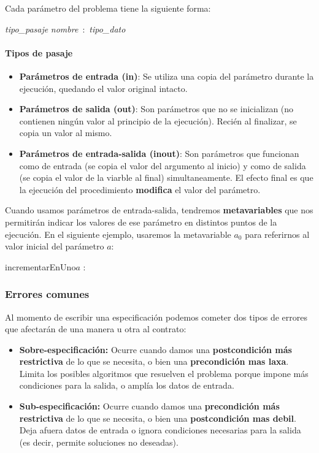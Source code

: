 Cada parámetro del problema tiene la siguiente forma:
\begin{center}
	\textit{tipo\_pasaje} \textit{nombre}~:~\textit{tipo\_dato}
\end{center}

\paragraph{Tipos de pasaje} 
\begin{itemize}
	\item \textbf{Parámetros de entrada (in)}: Se utiliza una copia del parámetro durante la ejecución, quedando el valor original intacto.
	\item \textbf{Parámetros de salida (out)}: Son parámetros que no se inicializan (no contienen ningún valor al principio de la ejecución). Recién al finalizar, se copia un valor al mismo.
	\item \textbf{Parámetros de entrada-salida (inout)}: Son parámetros que funcionan como de entrada (se copia el valor del argumento al inicio) y como de salida (se copia el valor de la viarble al final) simultaneamente. El efecto final es que la ejecución del procedimiento \textbf{modifica} el valor del parámetro.
\end{itemize}
Cuando usamos parámetros de entrada-salida, tendremos \textbf{metavariables} que nos permitirán indicar los valores de ese parámetro en distintos puntos de la ejecución. En el siguiente ejemplo, usaremos la metavariable $a_0$ para referirnos al valor inicial del parámetro $a$:

\begin{center}
	\begin{minipage}[]{0.8\textwidth}
		\begin{proc}{incrementarEnUno}{\Inout $a$ : \ent}{}
		\end{proc}
	\end{minipage}
\end{center}

\subsubsection{Errores comunes}
Al momento de escribir una especificación podemos cometer dos tipos de errores que afectarán de una manera u otra al contrato:

\begin{itemize}
	\item \textbf{Sobre-especificación:} Ocurre cuando damos una \textbf{postcondición más restrictiva} de lo que se necesita, o bien una \textbf{precondición mas laxa}. Limita los posibles algoritmos que resuelven el problema porque impone más condiciones para la salida, o amplía los datos de entrada.
	\item\textbf{Sub-especificación:} Ocurre cuando damos una \textbf{precondición más restrictiva} de lo que se necesita, o bien una \textbf{postcondición mas debil}. Deja afuera datos de entrada o ignora condiciones necesarias para la salida (es decir, permite soluciones no deseadas).
\end{itemize}

